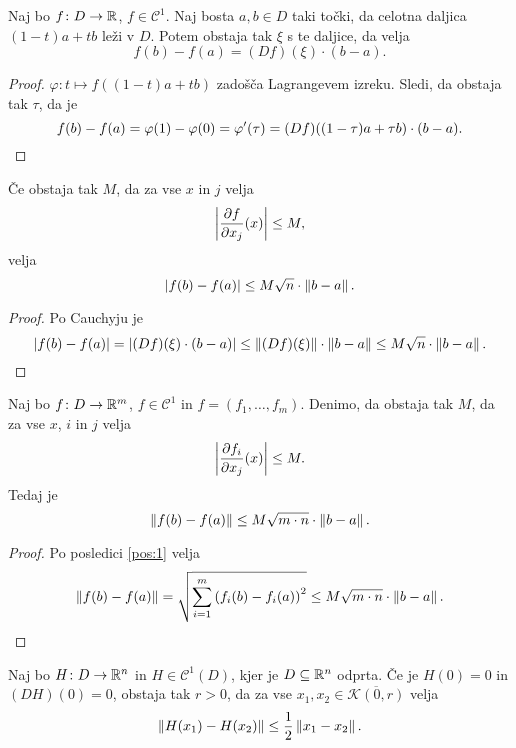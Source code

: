 
\begin{lema}
Naj bo $f \colon D \to \mathbb{R}$, $f \in \mathcal{C}^1$. Naj bosta
$a,b \in D$ taki točki, da celotna daljica $(1-t)a + tb$ leži v
$D$.
Potem obstaja tak $\xi$ s te daljice, da velja
\[
f(b) - f(a) = (Df)(\xi) \cdot (b-a).
\]
\end{lema}

\begin{proof}
$\varphi \colon t \mapsto f((1-t)a + tb)$ zadošča Lagrangevem
izreku. Sledi, da obstaja tak $\tau$, da je
\[
f(b) - f(a) =
\varphi(1) - \varphi(0) =
\varphi'(\tau) =
(Df)((1-\tau)a + \tau b) \cdot (b - a). \qedhere
\]
\end{proof}

\begin{posledica}\label{pos:1}
Če obstaja tak $M$, da za vse $x$ in $j$ velja
\[
\left\lvert \frac{\partial f}{\partial x_j}(x)\right\rvert \leq M,
\]
velja
\[
\left\lvert f(b) - f(a)\right\rvert \leq M \sqrt{n} \cdot \left\lVert b - a\right\rVert.
\]
\end{posledica}

\begin{proof}
Po Cauchyju je
\[
\left\lvert f(b) - f(a)\right\rvert =
\left\lvert (Df)(\xi) \cdot (b - a)\right\rvert \leq
\left\lVert (Df)(\xi)\right\rVert \cdot \left\lVert b - a\right\rVert \leq
M \sqrt{n} \cdot \left\lVert b - a\right\rVert. \qedhere
\]
\end{proof}

\begin{posledica}\label{pos:2}
Naj bo $f \colon D \to \mathbb{R}^m$, $f \in \mathcal{C}^1$ in
$f = (f_1, \dots, f_m)$. Denimo, da obstaja tak $M$, da za vse $x$,
$i$ in $j$ velja
\[
\left\lvert \frac{\partial f_i}{\partial x_j}(x)\right\rvert \leq M.
\]
Tedaj je
\[
\left\lVert f(b) - f(a)\right\rVert \leq M \sqrt{m \cdot n} \cdot \left\lVert b - a\right\rVert.
\]
\end{posledica}

\begin{proof}
Po posledici \ref{pos:1} velja
\[
\left\lVert f(b) - f(a)\right\rVert =
\sqrt{\sum_{i=1}^m \left(f_i(b) - f_i(a)\right)^2} \leq
M \sqrt{m \cdot n} \cdot \left\lVert b - a\right\rVert. \qedhere
\]
\end{proof}

\begin{lema}\label{lm:1}
Naj bo $H \colon D \to \mathbb{R}^n$ in $H \in \mathcal{C}^1(D)$, kjer je
$D \subseteq \mathbb{R}^n$ odprta. Če je $H(0)=0$ in $(DH)(0)=0$, obstaja
tak $r>0$, da za vse $x_1, x_2 \in \overline{\mathcal{K}(0,r)}$
velja
\[
\left\lVert H(x_1) - H(x_2)\right\rVert \leq \frac{1}{2} \left\lVert x_1 - x_2\right\rVert.
\]
\end{lema}

